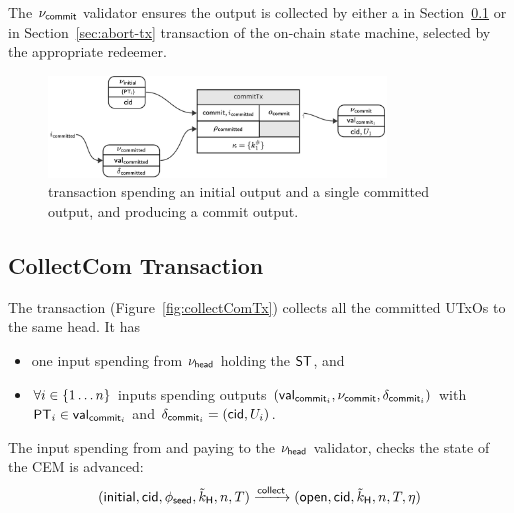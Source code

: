 \noindent The $\nu_{\mathsf{commit}}$ validator ensures the output is collected by either a \mtxCCom{} in Section~\ref{sec:collect-tx} or \mtxAbort{} in Section~\ref{sec:abort-tx} transaction of the on-chain state machine, selected by the appropriate redeemer.

\begin{figure}[h]
	\centering
	\includegraphics[width=0.8\textwidth]{figures/commitTx.pdf}
	\caption{\mtxCom{} transaction spending an initial output and a single
		committed output, and producing a commit output.}\label{fig:commitTx}
\end{figure}

\subsection{CollectCom Transaction}\label{sec:collect-tx}

\noindent The \mtxCCom{} transaction (Figure~\ref{fig:collectComTx}) collects all the committed UTxOs to the same head. It has
\begin{itemize}
	\item one input spending from $\nu_\mathsf{head}$ holding the $\mathsf{ST}$, and
	\item $\forall i \in \{1 \dots n\}$ inputs spending \mtxCom{} outputs $(\mathsf{val}_{\mathsf{commit}_{i}}, \nu_{\mathsf{commit}}, \delta_{\mathsf{commit}_{i}})$ with $\mathsf{PT}_{i} \in \mathsf{val}_{\mathsf{commit}_{i}}$ and $\delta_{\mathsf{commit}_{i}} = (\mathsf{cid}, U_{i})$.
\end{itemize}

\noindent The input spending from and paying to the $\nu_\mathsf{head}$ validator, checks the state
of the CEM is advanced:
\[
	(\mathsf{initial},\mathsf{cid},\phi_{\mathsf{seed}},\tilde{k}_{\mathsf{H}},n,T) \xrightarrow{\mathsf{collect}} (\mathsf{open},\mathsf{cid},\tilde{k}_{\mathsf{H}},n,T,\eta)
\]

